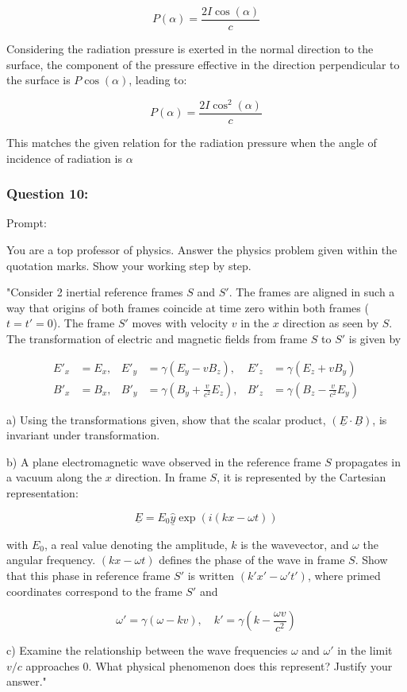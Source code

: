\documentclass[a4paper,11pt]{article}
\begin{document}
\[
P(\alpha) = \frac{2I\cos(\alpha)}{c}
\]

Considering the radiation pressure is exerted in the normal direction to the surface, the component of the pressure effective in the direction perpendicular to the surface is \(P\cos(\alpha)\), leading to:

\[
P(\alpha) = \frac{2I\cos^{2}(\alpha)}{c}
\]

This matches the given relation for the radiation pressure when the angle of incidence of radiation is \(\alpha\) 

\subsubsection*{Question 10:}

Prompt:
\begin{spverbatim}
    You are a top professor of physics. Answer the physics problem given within the quotation marks. Show your working step by step.

    "Consider 2 inertial reference frames \( S \) and \( S' \). The frames are aligned in such a way that origins of both frames coincide at time zero within both frames (\( t = t' = 0 \)). The frame \( S' \) moves with velocity \( v \) in the \( x \) direction as seen by \( S \). The transformation of electric and magnetic fields from frame \( S \) to \( S' \) is given by 

    \[
    \begin{aligned}
    E'_{x} &= E_{x}, & E'_{y} &= \gamma(E_{y} - vB_{z}), & E'_{z} &= \gamma(E_{z} + vB_{y}) \\
    B'_{x} &= B_{x}, & B'_{y} &= \gamma(B_{y} + \frac{v}{c^{2}} E_{z}), & B'_{z} &= \gamma(B_{z} - \frac{v}{c^{2}} E_{y})
    \end{aligned}
    \]

    a) Using the transformations given, show that the scalar product, \( (\underline{E} \cdot \underline{B}) \), is invariant under transformation.

    b) A plane electromagnetic wave observed in the reference frame \( S \) propagates in a vacuum along the \( x \) direction. In frame \( S \), it is represented by the Cartesian representation: 

    \[ \underline{E} = E_{0} \hat{\underline{y}} \exp(i(kx - \omega t)) \]

    with \( E_{0} \), a real value denoting the amplitude, \( k \) is the wavevector, and \( \omega \) the angular frequency. \( (kx - \omega t) \) defines the phase of the wave in frame \( S \). Show that this phase in reference frame \( S' \) is written \( (k'x' - \omega' t') \), where primed coordinates correspond to the frame \( S' \) and

    \[ \omega' = \gamma(\omega - kv), \quad k' = \gamma(k - \frac{\omega v}{c^{2}}) \]

    c) Examine the relationship between the wave frequencies \( \omega \) and \( \omega' \) in the limit \( v/c \) approaches \( 0 \). What physical phenomenon does this represent? Justify your answer."
\end{spverbatim}
\end{document}
